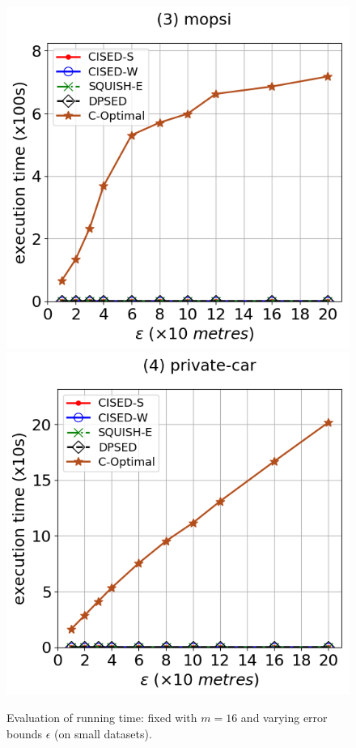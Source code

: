 {\begin{figure}[tb!]
\includegraphics[scale = 0.290]{Figures/Exp-opt-time-epsilon-mopsi.png}\hspace{1ex}
\includegraphics[scale = 0.290]{Figures/Exp-opt-time-epsilon-private.png}
\caption{\small Evaluation of running time: fixed with $m=16$ and varying error bounds $\epsilon$ (on small datasets).}
\label{fig:time-optimal-epsilon}
\vspace{-1ex}
\end{figure}




}
